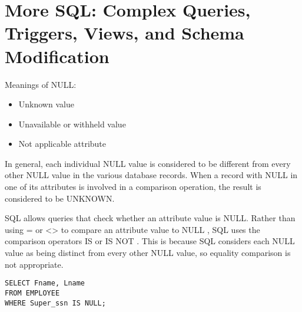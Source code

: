 \chapter{More SQL: Complex Queries, Triggers, Views, and Schema Modification}

    \par Meanings of NULL:
      \begin{itemize}
        \item Unknown value
        \item Unavailable or withheld value
        \item Not applicable attribute
      \end{itemize}
    \par In general, each individual NULL value is considered to be different from every other NULL value in the various database records. When a record with NULL in one of its attributes is involved in a comparison operation, the result is considered to be UNKNOWN.
    \par SQL allows queries that check whether an attribute value is NULL. Rather than using = or <> to compare an attribute value to NULL , SQL uses the comparison operators IS or IS NOT . This is because SQL considers each NULL value as being distinct from every other NULL value, so equality comparison is not appropriate.
      \begin{lstlisting}
SELECT Fname, Lname
FROM EMPLOYEE
WHERE Super_ssn IS NULL;
      \end{lstlisting}

